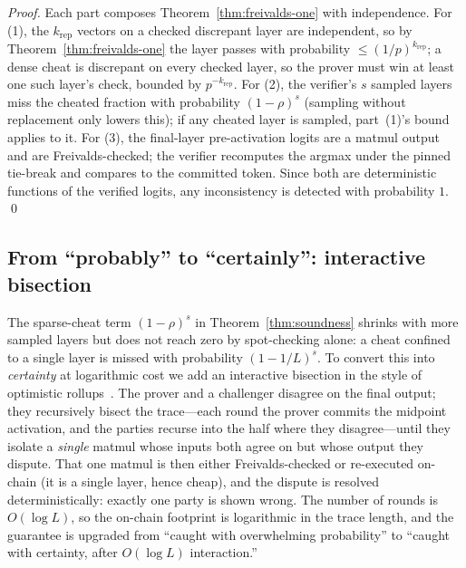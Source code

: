 \begin{proof}
Each part composes Theorem~\ref{thm:freivalds-one} with independence. For (1), the
$k_{\mathrm{rep}}$ vectors on a checked discrepant layer are independent, so by
Theorem~\ref{thm:freivalds-one} the layer passes with probability
$\le (1/p)^{k_{\mathrm{rep}}}$; a dense cheat is discrepant on every checked layer, so
the prover must win at least one such layer's check, bounded by
$p^{-k_{\mathrm{rep}}}$. For (2), the verifier's $s$ sampled layers miss the cheated
fraction with probability $(1-\rho)^s$ (sampling without replacement only lowers
this); if any cheated layer is sampled, part~(1)'s bound applies to it. For (3), the
final-layer pre-activation logits are a matmul output and are Freivalds-checked; the
verifier recomputes the argmax under the pinned tie-break and compares to the
committed token. Since both are deterministic functions of the verified logits, any
inconsistency is detected with probability $1$. \qed
\end{proof}

\subsection{From ``probably'' to ``certainly'': interactive bisection}

The sparse-cheat term $(1-\rho)^s$ in Theorem~\ref{thm:soundness} shrinks with more
sampled layers but does not reach zero by spot-checking alone: a cheat confined to a
single layer is missed with probability $(1-1/L)^s$. To convert this into
\emph{certainty} at logarithmic cost we add an interactive bisection in the style of
optimistic rollups~\cite{arbitrum,gensynverde}. The prover and a challenger disagree
on the final output; they recursively bisect the trace---each round the prover
commits the midpoint activation, and the parties recurse into the half where they
disagree---until they isolate a \emph{single} matmul whose inputs both agree on but
whose output they dispute. That one matmul is then either Freivalds-checked or
re-executed on-chain (it is a single layer, hence cheap), and the dispute is resolved
deterministically: exactly one party is shown wrong. The number of rounds is
$O(\log L)$, so the on-chain footprint is logarithmic in the trace length, and the
guarantee is upgraded from ``caught with overwhelming probability'' to ``caught with
certainty, after $O(\log L)$ interaction.''

